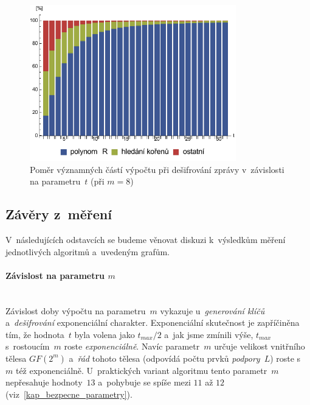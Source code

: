 \documentclass[thesis=M,czech,hidelinks]{FITthesis}[2012/06/26]
\newcommand{\0}{{\textcolor[gray]{0.75}{0}}}
\begin{document}
\begin{figure}[!ht]
    \centering
    \includegraphics[width=0.8\textwidth]{../implementace/grafy/chart_m8_desifrovani.pdf}
    \caption[Poměr částí výpočtu při dešifrování]{
        Poměr významných částí výpočtu při dešifrování zprávy v~závislosti na
        parametru~$t$ (při $m=8$)
    }
    \label{obr_mereni_pomer_desifr}
\end{figure}

\clearpage

\subsection{Závěry z~měření}

V~následujících odstavcích se budeme věnovat diskuzi k~výsledkům měření
jednotlivých algoritmů a~uvedeným grafům.

\paragraph{Závislost na parametru $m$} \hfill \\
Závislost doby výpočtu na parametru~$m$ vykazuje u~\emph{generování klíčů}
a~\emph{dešifrování} exponenciální charakter. Exponenciální skutečnost je
zapříčiněna tím, že hodnota~$t$ byla volena jako $t_{max}/2$ a~jak jsme zmínili
výše, $t_{max}$ s~rostoucím~$m$ roste \emph{exponenciálně}. Navíc parametr~$m$
určuje velikost vnitřního tělesa $GF(2^m)$ a~\emph{řád} tohoto tělesa (odpovídá
počtu prvků \emph{podpory}~$L$) roste s~$m$ též exponenciálně. U~praktických
variant algoritmu tento parametr~$m$ nepřesahuje hodnoty~$13$ a~pohybuje se
spíše mezi $11$ až $12$ (viz~\ref{kap_bezpecne_parametry}).

\end{document}
